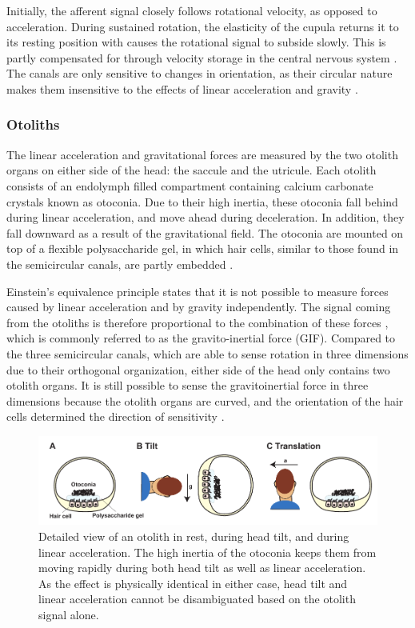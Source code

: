Initially, the afferent signal closely follows rotational velocity, as opposed to acceleration. During sustained rotation, the elasticity of the cupula returns it to its resting position with causes the rotational signal to subside slowly. This is partly compensated for through velocity storage in the central nervous system \cite{goldberg2012}. The canals are only sensitive to changes in orientation, as their circular nature makes them insensitive to the effects of linear acceleration and gravity \cite{goldberg2012}. 


\subsubsection{Otoliths}
The linear acceleration and gravitational forces are measured by the two otolith organs on either side of the head: the saccule and the utricule. Each otolith consists of an endolymph filled compartment containing calcium carbonate crystals known as otoconia. Due to their high inertia, these otoconia fall behind during linear acceleration, and move ahead during deceleration. In addition, they fall downward as a result of the gravitational field. The otoconia are mounted on top of a flexible polysaccharide gel, in which hair cells, similar to those found in the semicircular canals, are partly embedded \cite{goldberg2012}.  

Einstein's equivalence principle states that  it is not possible to measure forces caused by linear acceleration and by gravity independently. The signal coming from the otoliths is therefore proportional to the combination of these forces \cite{fernandez1976b}, which is commonly referred to as the gravito-inertial force (GIF). Compared to the three semicircular canals, which are able to sense rotation in three dimensions due to their orthogonal organization, either side of the head only contains two otolith organs. It is still possible to sense the gravitoinertial force in three dimensions because the otolith organs are curved, and the orientation of the hair cells determined the direction of sensitivity \cite{goldberg2012}.

\begin{figure}
    \includegraphics[width=1.0\textwidth]{src/intro/figures/otoliths.pdf}
    \caption{Detailed view of an otolith  in rest,  during head tilt, and  during linear acceleration. The high inertia of the otoconia keeps them from moving rapidly during both head tilt as well as linear acceleration. As the effect is physically identical in either case, head tilt and linear acceleration cannot be disambiguated based on the otolith signal alone.}
    \label{intro:fig7}
\end{figure}

